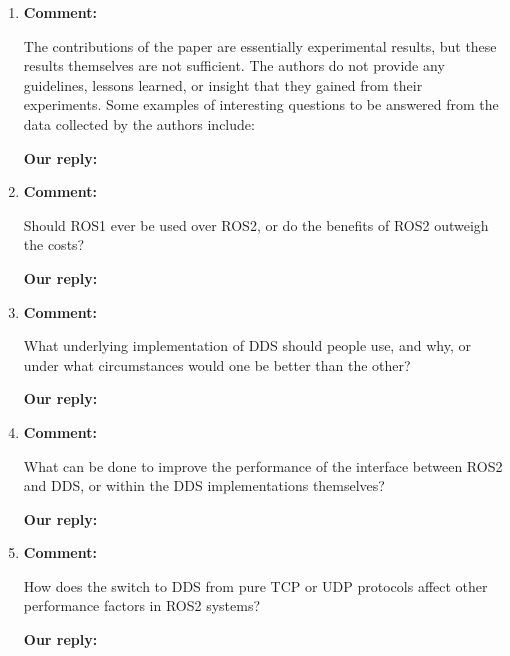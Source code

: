 \documentclass{article}
\begin{document}
\begin{enumerate}

\item \begin{flushleft}
    \textbf{Comment:}
  \end{flushleft}
  The contributions of the paper are essentially experimental results, but these results themselves are not sufficient. The authors do not provide any guidelines, lessons learned, or insight that they gained from their experiments.  Some examples of interesting questions to be answered from the data collected by the authors include:

  \begin{flushleft}
    \textbf{Our reply:}
  \end{flushleft}


\item \begin{flushleft}
    \textbf{Comment:}
  \end{flushleft}
  Should ROS1 ever be used over ROS2, or do the benefits of ROS2 outweigh the costs?

  \begin{flushleft}
    \textbf{Our reply:}
  \end{flushleft}


\item \begin{flushleft}
    \textbf{Comment:}
  \end{flushleft}
  What underlying implementation of DDS should people use, and why, or under what circumstances would one be better than the other? 

  \begin{flushleft}
    \textbf{Our reply:}
  \end{flushleft}


\item \begin{flushleft}
    \textbf{Comment:}
  \end{flushleft}
  What can be done to improve the performance of the interface between ROS2 and DDS, or within the DDS implementations themselves?

  \begin{flushleft}
    \textbf{Our reply:}
  \end{flushleft}


\item \begin{flushleft}
    \textbf{Comment:}
  \end{flushleft}
  How does the switch to DDS from pure TCP or UDP protocols affect other performance factors in ROS2 systems? 

  \begin{flushleft}
    \textbf{Our reply:}
  \end{flushleft}

\end{enumerate}
\end{document}
